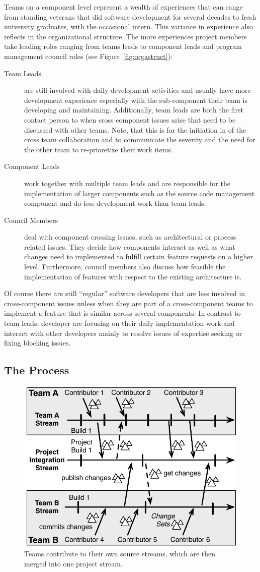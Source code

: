 Teams on a component level represent a wealth of experiences that can range from standing veterans that did software development for several decades to fresh university graduates, with the occasional intern.
This variance in experience also reflects in the organizational structure.
The more experiences project members take leading roles ranging from teams leads to component leads and program management council roles (see Figure~\ref{fig:orgastruct}):
\begin{description}
\item[Team Leads] are still involved with daily development activities and usually have more development experience especially with the sub-component their team is developing and maintaining.
Additionally, team leads are both the first contact person to when cross component issues arise that need to be discussed with other teams.
Note, that this is for the initiation in of the cross team collaboration and to communicate the severity and the need for the other team to re-prioretize their work items.
\item[Component Leads] work together with multiple team leads and are responsible for the implementation of larger components such as the source code management component and do less development work than team leads.
\item[Council Members] deal with component crossing issues, such as architectural or process related issues.
They decide how components interact as well as what changes need to implemented to fulfill certain feature requests on a higher level.
Furthermore, council members also discuss how feasible the implementation of features with respect to the existing architecture is.
\end{description}
Of course there are still ``regular'' software developers that are less involved in cross-component issues unless when they are part of a cross-component teams to implement a feature that is similar across several components.
In contrast to team leads, developer are focusing on their daily implementation work and interact with other developers mainly to resolve issues of expertise seeking or fixing blocking issues.

\subsection{The Process}
\begin{figure}[t]
\begin{center}
\includegraphics[width=.5\textwidth]{figures/BuildResult}
\caption{Teams contribute to their own source streams, which are then merged into one project stream.}
\label{fig:buildresult1}
\end{center}
\end{figure}

